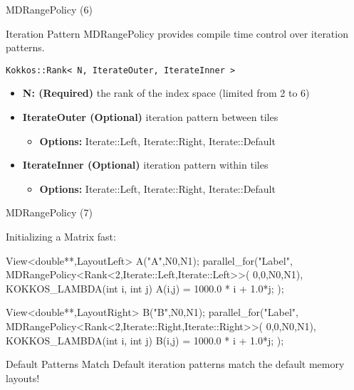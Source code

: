 \begin{frame}[fragile]{MDRangePolicy (6)}
\begin{block}{Iteration Pattern}
MDRangePolicy provides compile time control over iteration patterns.
\end{block}

  \begin{lstlisting}[basicstyle=\large,gobble=4]
    Kokkos::Rank< N, IterateOuter, IterateInner >
  \end{lstlisting}

  \begin{itemize}
    \item{\small{\textbf{N: (Required)} the rank of the index space (limited from 2 to 6)}}
    \item{\small{\textbf{IterateOuter (Optional)} iteration pattern between tiles}}
    \begin{itemize}
      \item{\small{\textbf{Options:} Iterate::Left, Iterate::Right, Iterate::Default}}
    \end{itemize}
    \item{\small{\textbf{IterateInner (Optional)} iteration pattern within tiles}}
    \begin{itemize}
      \item{\small{\textbf{Options:} Iterate::Left, Iterate::Right, Iterate::Default}}
    \end{itemize}
  \end{itemize}
\end{frame}


\begin{frame}[fragile]{MDRangePolicy (7)}

  Initializing a Matrix fast:
  
\begin{code}[keywords={LayoutLeft,Iterate,Left,Right}]
View<double**,LayoutLeft> A("A",N0,N1);
parallel_for("Label", 
  MDRangePolicy<Rank<2,Iterate::Left,Iterate::Left>>(
	{0,0},{N0,N1}), 
  KOKKOS_LAMBDA(int i, int j) {
    A(i,j) = 1000.0 * i + 1.0*j;
});
\end{code}

\begin{code}[keywords={LayoutRight}]
View<double**,LayoutRight> B("B",N0,N1);
parallel_for("Label", 
  MDRangePolicy<Rank<2,Iterate::Right,Iterate::Right>>(
	{0,0},{N0,N1}), 
  KOKKOS_LAMBDA(int i, int j) {
    B(i,j) = 1000.0 * i + 1.0*j;
});
\end{code} 

\pause

	\begin{block}{Default Patterns Match}
Default iteration patterns match the default memory layouts!
	\end{block}
\end{frame}



